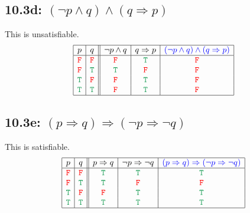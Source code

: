 \documentclass{article}
\begin{document}
\subsection*{10.3d: $(\neg p\land q)\land(q\Rightarrow p)$}
This is unsatisfiable.
\[\begin{array}{|c|c||c|c|c|}
\hline
p&q&\neg p\land q&q\Rightarrow p&\textcolor{blue}{(\neg p\land q)\land(q\Rightarrow p)}\\
\hline
\textcolor{red}{\tt{F}}&\textcolor{red}{\tt{F}}&\textcolor{red}{\tt{F}}&\textcolor{ForestGreen}{\tt{T}}&\textcolor{red}{\tt{F}}\\
\textcolor{red}{\tt{F}}&\textcolor{ForestGreen}{\tt{T}}&\textcolor{ForestGreen}{\tt{T}}&\textcolor{red}{\tt{F}}&\textcolor{red}{\tt{F}}\\
\textcolor{ForestGreen}{\tt{T}}&\textcolor{red}{\tt{F}}&\textcolor{red}{\tt{F}}&\textcolor{ForestGreen}{\tt{T}}&\textcolor{red}{\tt{F}}\\
\textcolor{ForestGreen}{\tt{T}}&\textcolor{ForestGreen}{\tt{T}}&\textcolor{red}{\tt{F}}&\textcolor{ForestGreen}{\tt{T}}&\textcolor{red}{\tt{F}}\\
\hline
\end{array}\]
\subsection*{10.3e: $(p\Rightarrow q)\Rightarrow(\neg p\Rightarrow\neg q)$}
This is satisfiable.
\[\begin{array}{|c|c||c|c|c|}
\hline
p&q&p\Rightarrow q&\neg p\Rightarrow\neg q&\textcolor{blue}{(p\Rightarrow q)\Rightarrow(\neg p\Rightarrow\neg q)}\\
\hline
\textcolor{red}{\tt{F}}&\textcolor{red}{\tt{F}}&\textcolor{ForestGreen}{\tt{T}}&\textcolor{ForestGreen}{\tt{T}}&\textcolor{ForestGreen}{\tt{T}}\\
\textcolor{red}{\tt{F}}&\textcolor{ForestGreen}{\tt{T}}&\textcolor{ForestGreen}{\tt{T}}&\textcolor{red}{\tt{F}}&\textcolor{red}{\tt{F}}\\
\textcolor{ForestGreen}{\tt{T}}&\textcolor{red}{\tt{F}}&\textcolor{red}{\tt{F}}&\textcolor{ForestGreen}{\tt{T}}&\textcolor{ForestGreen}{\tt{T}}\\
\textcolor{ForestGreen}{\tt{T}}&\textcolor{ForestGreen}{\tt{T}}&\textcolor{ForestGreen}{\tt{T}}&\textcolor{ForestGreen}{\tt{T}}&\textcolor{ForestGreen}{\tt{T}}\\
\hline
\end{array}\]
\end{document}
